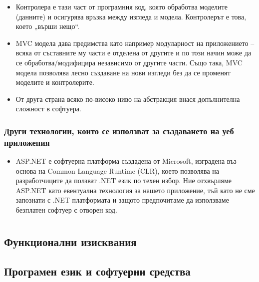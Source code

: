 \documentclass[pdftex,12pt,a4paper]{report}
\begin{document}
\begin{itemize}
\begin{itemize}
			\item Контролера е тази част от програмния код, която обработва моделите (данните) и осигурява връзка между изгледа и модела. Контролерът е това, което „върши нещо“.
			\item MVC модела дава предимства като например модуларност на приложението – всяка от съставните му части е отделена от другите и по този начин може да се обработва/модифицира независимо от другите части. Също така, MVC модела позволява лесно създаване на нови изгледи без да се променят моделите и контролерите.
			\item От друга страна всяко по-високо ниво на абстракция внася допълнителна сложност в софтуера.
		\end{itemize}
\end{itemize}
\subsection[Други технологии] {Други технологии, които се използват за създаването на уеб приложения}
\begin{itemize}
	\item ASP.NET е софтуерна платформа създадена от Microsoft, изградена въз основа на Common Language Runtime (CLR), което позволява на разработчиците да ползват .NET език по техен избор. Ние отхвърляме ASP.NET като евентуална технология за нашето приложение, тъй като не сме запознати с .NET платформата и защото предпочитаме да използваме безплатен софтуер с отворен код.
\end{itemize}

\chapter[Втора глава] {}
\section[Функционални изисквания] {Функционални изисквания}
\section[Програмен език и софтуерни средства] {Програмен език и софтуерни средства}
\end{document}
